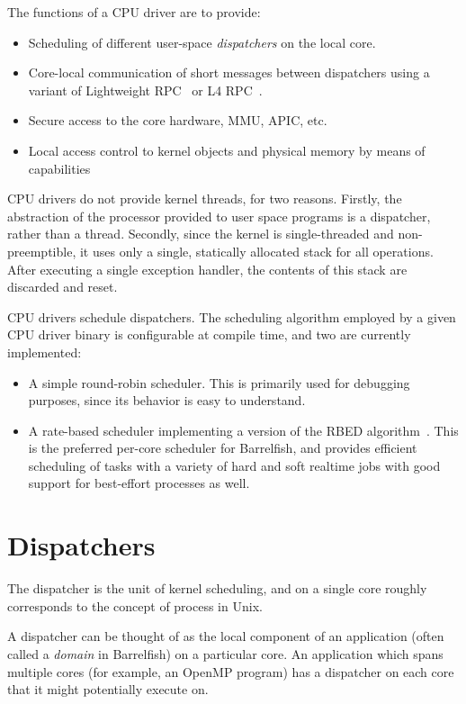 \documentclass[a4paper,twoside]{report} %
\begin{document}
The functions of a CPU driver are to provide:
\begin{itemize}
\item Scheduling of different user-space \textit{dispatchers} on the
  local core.
\item Core-local communication of short messages between dispatchers
  using a variant of Lightweight RPC~\cite{lrpc:tocs90} or L4
  RPC~\cite{Liedtke:1993:IIK:168619.168633}. 
\item Secure access to the core hardware, MMU, APIC, etc.
\item Local access control to kernel objects and physical memory by
  means of capabilities
\end{itemize}

CPU drivers do not provide kernel threads, for two reasons.  Firstly,
the abstraction of the processor provided to user space programs is a
dispatcher, rather than a thread.  Secondly, since the kernel is
single-threaded and non-preemptible, it uses only a single, statically
allocated stack for all operations. After executing a single exception
handler, the contents of this stack are discarded and reset. 

CPU drivers schedule dispatchers.  The scheduling algorithm employed
by a given CPU driver binary is configurable at compile time, and two
are currently implemented:
\begin{itemize}
\item A simple round-robin scheduler.  This is primarily used for
  debugging purposes, since its behavior is easy to understand.
\item A rate-based scheduler implementing a version of the RBED
  algorithm~\cite{Brandt:2003:DIS:956418.956606}. This is the
  preferred per-core scheduler for Barrelfish, and provides efficient
  scheduling of tasks with a variety of hard and soft realtime jobs
  with good support for best-effort processes as well. 
\end{itemize}

\section{Dispatchers}

The dispatcher is the unit of kernel scheduling, and on a single core
roughly corresponds to the concept of process in Unix.  

A dispatcher can be thought of as the local component of an
application (often called a \textit{domain} in Barrelfish) on a
particular core.  An application which spans multiple cores (for
example, an OpenMP program) has a dispatcher on each core that it
might potentially execute on.  
\end{document}
